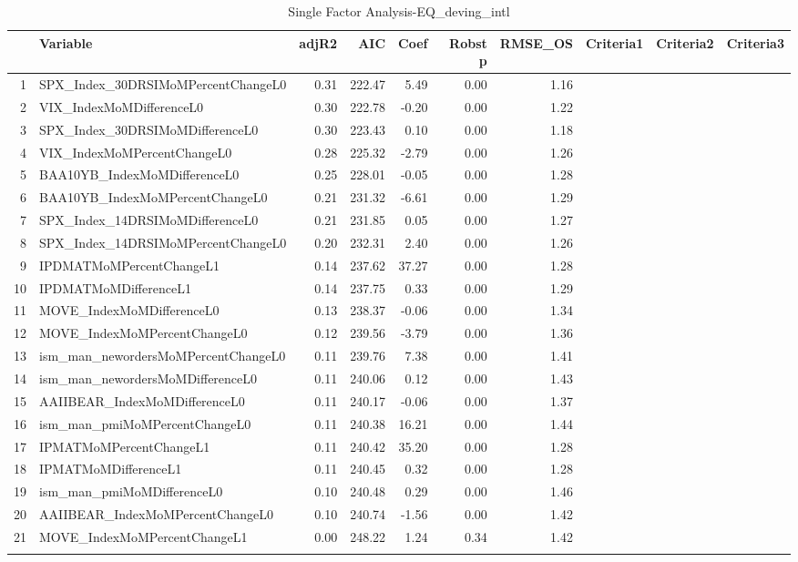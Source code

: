 \begin{longtable}{rlrrrrrlll}
  \hline
 & Variable & adjR2 & AIC & Coef & Robst p & RMSE\_OS & Criteria1 & Criteria2 & Criteria3 \\ 
  \hline
1 & SPX\_Index\_30DRSIMoMPercentChangeL0 & 0.31 & 222.47 & 5.49 & 0.00 & 1.16 &  &  &  \\ 
  2 & VIX\_IndexMoMDifferenceL0 & 0.30 & 222.78 & -0.20 & 0.00 & 1.22 &  &  &  \\ 
  3 & SPX\_Index\_30DRSIMoMDifferenceL0 & 0.30 & 223.43 & 0.10 & 0.00 & 1.18 &  &  &  \\ 
  4 & VIX\_IndexMoMPercentChangeL0 & 0.28 & 225.32 & -2.79 & 0.00 & 1.26 &  &  &  \\ 
  5 & BAA10YB\_IndexMoMDifferenceL0 & 0.25 & 228.01 & -0.05 & 0.00 & 1.28 &  &  &  \\ 
  6 & BAA10YB\_IndexMoMPercentChangeL0 & 0.21 & 231.32 & -6.61 & 0.00 & 1.29 &  &  &  \\ 
  7 & SPX\_Index\_14DRSIMoMDifferenceL0 & 0.21 & 231.85 & 0.05 & 0.00 & 1.27 &  &  &  \\ 
  8 & SPX\_Index\_14DRSIMoMPercentChangeL0 & 0.20 & 232.31 & 2.40 & 0.00 & 1.26 &  &  &  \\ 
  9 & IPDMATMoMPercentChangeL1 & 0.14 & 237.62 & 37.27 & 0.00 & 1.28 &  &  &  \\ 
  10 & IPDMATMoMDifferenceL1 & 0.14 & 237.75 & 0.33 & 0.00 & 1.29 &  &  &  \\ 
  11 & MOVE\_IndexMoMDifferenceL0 & 0.13 & 238.37 & -0.06 & 0.00 & 1.34 &  &  &  \\ 
  12 & MOVE\_IndexMoMPercentChangeL0 & 0.12 & 239.56 & -3.79 & 0.00 & 1.36 &  &  &  \\ 
  13 & ism\_man\_newordersMoMPercentChangeL0 & 0.11 & 239.76 & 7.38 & 0.00 & 1.41 &  &  &  \\ 
  14 & ism\_man\_newordersMoMDifferenceL0 & 0.11 & 240.06 & 0.12 & 0.00 & 1.43 &  &  &  \\ 
  15 & AAIIBEAR\_IndexMoMDifferenceL0 & 0.11 & 240.17 & -0.06 & 0.00 & 1.37 &  &  &  \\ 
  16 & ism\_man\_pmiMoMPercentChangeL0 & 0.11 & 240.38 & 16.21 & 0.00 & 1.44 &  &  &  \\ 
  17 & IPMATMoMPercentChangeL1 & 0.11 & 240.42 & 35.20 & 0.00 & 1.28 &  &  &  \\ 
  18 & IPMATMoMDifferenceL1 & 0.11 & 240.45 & 0.32 & 0.00 & 1.28 &  &  &  \\ 
  19 & ism\_man\_pmiMoMDifferenceL0 & 0.10 & 240.48 & 0.29 & 0.00 & 1.46 &  &  &  \\ 
  20 & AAIIBEAR\_IndexMoMPercentChangeL0 & 0.10 & 240.74 & -1.56 & 0.00 & 1.42 &  &  &  \\ 
  21 & MOVE\_IndexMoMPercentChangeL1 & 0.00 & 248.22 & 1.24 & 0.34 & 1.42 &  &  &  \\ 
   \hline
\hline
\caption{Single Factor Analysis-EQ_deving_intl} 
\end{longtable}
